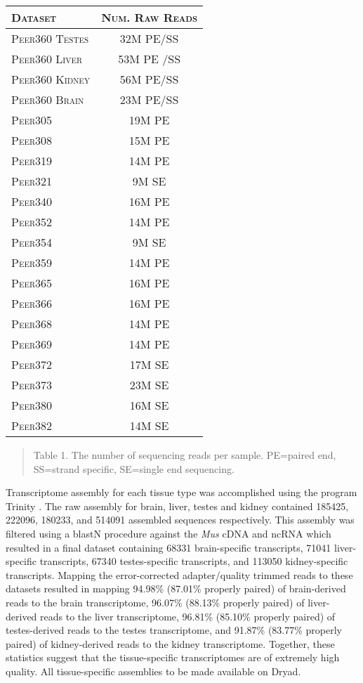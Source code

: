 \documentclass[11pt]{article}
\begin{document}
\begin{center}
\begin{tabular}{l|c }
\textsc{Dataset}& \textsc{Num. Raw Reads} \\
\hline 
\textsc{Peer360 Testes} & 32M PE/SS  \\
\textsc{Peer360 Liver} & 53M PE /SS  \\
\textsc{Peer360 Kidney} & 56M PE/SS   \\
\textsc{Peer360 Brain}  & 23M PE/SS \\
\textsc{Peer305}  & 19M PE  \\
\textsc{Peer308}  & 15M PE  \\
\textsc{Peer319}  & 14M PE  \\
\textsc{Peer321}  & 9M SE  \\
\textsc{Peer340}  & 16M PE  \\
\textsc{Peer352}  & 14M PE  \\
\textsc{Peer354}  & 9M SE  \\
\textsc{Peer359}  & 14M PE  \\
\textsc{Peer365}  & 16M PE \\
\textsc{Peer366}  & 16M PE  \\
\textsc{Peer368}  & 14M PE  \\
\textsc{Peer369}  & 14M PE  \\
\textsc{Peer372}  & 17M SE  \\
\textsc{Peer373}  & 23M SE  \\
\textsc{Peer380}  & 16M SE  \\
\textsc{Peer382}  & 14M SE  \\
\end{tabular}
\begin{quote}
\small{Table 1. The number of sequencing reads per sample. PE=paired end, SS=strand specific, SE=single end sequencing. }
\end{quote}
\end{center}

Transcriptome assembly for each tissue type was accomplished using the program Trinity \cite{Haas:2013jq}. The raw assembly for brain, liver, testes and kidney contained 185425, 222096, 180233, and 514091 assembled sequences respectively. This assembly was filtered using a blastN procedure against the \textit{Mus} cDNA and ncRNA which resulted in a final dataset containing 68331 brain-specific transcripts, 71041 liver-specific transcripts, 67340 testes-specific transcripts, and 113050 kidney-specific transcripts. Mapping the error-corrected adapter/quality trimmed reads to these datasets resulted in mapping 94.98\% (87.01\% properly paired) of brain-derived reads to the brain transcriptome, 96.07\% (88.13\% properly paired) of liver-derived reads to the liver transcriptome, 96.81\% (85.10\% properly paired) of testes-derived reads to the testes transcriptome, and 91.87\% (83.77\% properly paired) of kidney-derived reads to the kidney transcriptome. Together, these statistics suggest that the tissue-specific transcriptomes are of extremely high quality. All tissue-specific assemblies to be made available on Dryad. \\
\end{document}
